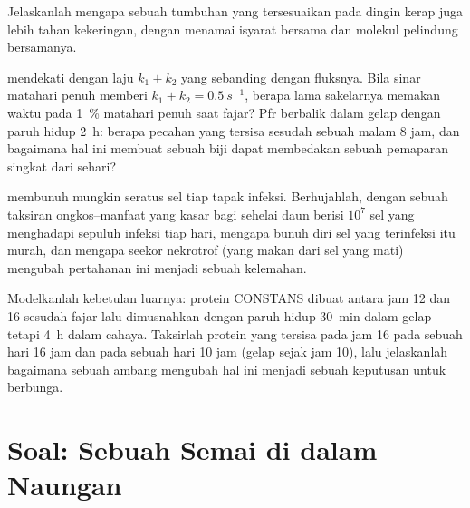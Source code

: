 \begin{exercise}[$\star\star$]\label{exo:b3:plant-molecular-physiology:9}
Jelaskanlah mengapa sebuah tumbuhan yang tersesuaikan pada dingin kerap juga lebih tahan
kekeringan, dengan menamai isyarat bersama dan molekul pelindung bersamanya.
\end{exercise}

\begin{exercise}[$\star\star\star$]\label{exo:b3:plant-molecular-physiology:10}
 mendekati  dengan laju $k_{1} + k_{2}$
yang sebanding dengan fluksnya. Bila sinar matahari penuh memberi $k_{1} + k_{2} =
\qty{0.5}{s^{-1}}$, berapa lama sakelarnya memakan waktu pada
\qty{1}{\%} matahari penuh saat fajar? Pfr berbalik dalam gelap dengan paruh hidup
\qty{2}{h}: berapa pecahan yang tersisa sesudah sebuah malam 8 jam, dan bagaimana
hal ini membuat sebuah biji dapat membedakan sebuah pemaparan singkat dari sehari?
\end{exercise}

\begin{exercise}[$\star\star\star$]\label{exo:b3:plant-molecular-physiology:11}
 membunuh mungkin seratus sel tiap
tapak infeksi. Berhujahlah, dengan sebuah taksiran ongkos--manfaat yang kasar bagi sehelai daun
berisi $10^{7}$ sel yang menghadapi sepuluh infeksi tiap hari, mengapa bunuh diri sel yang
terinfeksi itu murah, dan mengapa seekor nekrotrof (yang makan dari sel yang mati) mengubah
pertahanan ini menjadi sebuah kelemahan.
\end{exercise}

\begin{exercise}[$\star\star\star$]\label{exo:b3:plant-molecular-physiology:12}
Modelkanlah kebetulan luarnya: protein CONSTANS dibuat antara jam 12
dan 16 sesudah fajar lalu dimusnahkan dengan paruh hidup \qty{30}{min} dalam
gelap tetapi \qty{4}{h} dalam cahaya. Taksirlah protein yang tersisa pada
jam 16 pada sebuah hari 16 jam dan pada sebuah hari 10 jam (gelap sejak jam 10), lalu
jelaskanlah bagaimana sebuah ambang mengubah hal ini menjadi sebuah keputusan untuk berbunga.
\end{exercise}

\section{Soal: Sebuah Semai di dalam Naungan}

